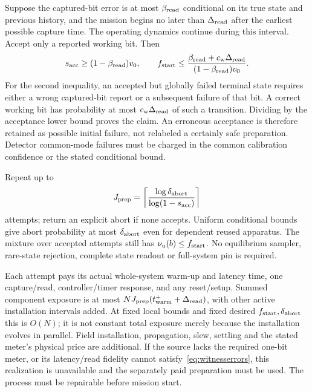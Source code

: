 Suppose the captured-bit error is at most $\beta_{\rm read}$ conditional
on its true state and previous history, and the mission begins no later
than $\Delta_{\rm read}$ after the earliest possible capture time. The
operating dynamics continue during this interval. Accept only a reported
working bit. Then
\begin{equation}
 s_{\rm acc}\ge(1-\beta_{\rm read})v_0,\qquad
 f_{\rm start}\le
 \frac{\beta_{\rm read}+c_{\rm w}\Delta_{\rm read}}
      {(1-\beta_{\rm read})v_0}.
 \label{eq:witnesserrors}
\end{equation}
For the second inequality, an accepted but globally failed terminal
state requires either a wrong captured-bit report or a subsequent failure
of that bit. A correct working bit has probability at most
$c_{\rm w}\Delta_{\rm read}$ of such a transition. Dividing by the
acceptance lower bound proves the claim. An erroneous acceptance is
therefore retained as possible initial failure, not relabeled a certainly
safe preparation. Detector common-mode failures must be charged in the
common calibration confidence or the stated conditional bound.

Repeat up to
\[
 J_{\rm prep}=\left\lceil
 \frac{\log\delta_{\rm abort}}{\log(1-s_{\rm acc})}
 \right\rceil
\]
attempts; return an explicit abort if none accepts. Uniform conditional
bounds give abort probability at most $\delta_{\rm abort}$ even for
dependent reused apparatus. The mixture over accepted attempts still
has $\nu_u(b)\le f_{\rm start}$. No equilibrium sampler, rare-state
rejection, complete state readout or full-system pin is required.

Each attempt pays its actual whole-system warm-up and latency time,
one capture/read, controller/timer response, and any reset/setup.
Summed component exposure is at most
$N J_{\rm prep}(t_{\rm warm}^{+}+\Delta_{\rm read})$, with other active
installation intervals added. At fixed local bounds and fixed desired
$f_{\rm start},\delta_{\rm abort}$ this is $O(N)$; it is not constant
total exposure merely because the installation evolves in parallel.
Field installation, propagation, slew, settling and the stated meter's
physical price are additional. If the source lacks the required one-bit
meter, or its latency/read fidelity cannot satisfy~\eqref{eq:witnesserrors},
this realization is unavailable and the separately paid preparation must
be used. The process must be repairable before mission start.

